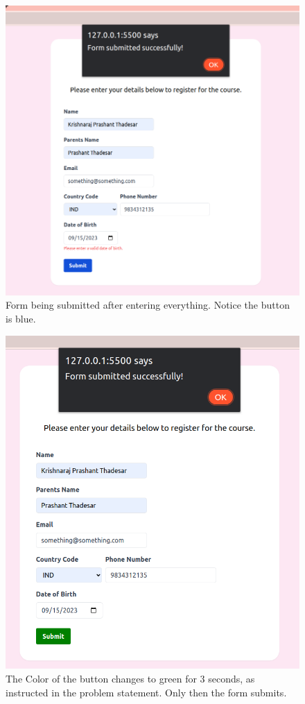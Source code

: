 \documentclass[11pt]{article}
\begin{document}
\begin{figure}[H]
    \centering
    \includegraphics[width=.95\textwidth]{05.png}
    \caption{Form being submitted after entering everything. Notice the button is blue. }
\end{figure}

\begin{figure}[H]
    \centering
    \includegraphics[width=.95\textwidth]{06.png}
    \caption{The Color of the button changes to green for 3 seconds, as instructed in the problem statement. Only then the form submits. }
\end{figure}
\end{document}
